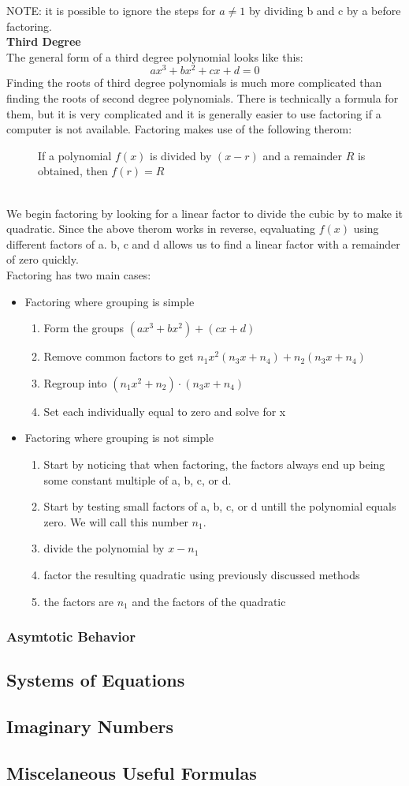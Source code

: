 \documentclass[../Math_Notes.tex]{subfiles}
\begin{document}
NOTE: it is possible to ignore the steps for $a\ne 1$ by dividing b and c by a before factoring.\\
\textbf{Third Degree} \\ 
The general form of a third degree polynomial looks like this:
\[ax^{3}+bx^{2}+cx+d=0\]
Finding the roots of third degree polynomials is much more complicated than finding the roots of second degree polynomials. There is technically a formula for them, but it is very complicated and it is generally easier to use factoring if a computer is not available. Factoring makes use of the following therom:
\begin{figure}[htbp]
  \centering
If a polynomial $f(x)$ is divided by $(x-r)$ and a remainder $R$ is obtained, then $f(r)=R$
\end{figure}\\
We begin factoring by looking for a linear factor to divide the cubic by to make it quadratic. Since the above therom works in reverse, eqvaluating $f(x)$ using different factors of a. b, c and d allows us to find a linear factor with a remainder of zero quickly.\\ 
Factoring has two main cases:
\begin{itemize}
  \item Factoring where grouping is simple
    \begin{enumerate}
      \item Form the groups $(ax^{3}+bx^{2}) + (cx+d)$
      \item Remove common factors to get $n_{1}x^{2}(n_{3}x+n_{4})+n_{2}(n_{3}x+n_{4})$
      \item Regroup into $(n_{1}x^{2}+ n_{2})\cdot (n_{3}x+n_{4})$
      \item Set each individually equal to zero and solve for x
    \end{enumerate}
  \item Factoring where grouping is not simple
    \begin{enumerate}
      \item Start by noticing that when factoring, the factors always end up being some constant multiple of a, b, c, or d.
      \item Start by testing small factors of a, b, c, or d untill the polynomial equals zero. We will call this number $n_{1}$.
      \item divide the polynomial by $x-n_{1}$
      \item factor the resulting quadratic using previously discussed methods
      \item the factors are $n_{1}$ and the factors of the quadratic
    \end{enumerate}
\end{itemize}
\subsubsection{Asymtotic Behavior}
\clearpage
\subsection{Systems of Equations}
\clearpage
\subsection{Imaginary Numbers}
\clearpage
\subsection{Miscelaneous Useful Formulas}
\end{document}
